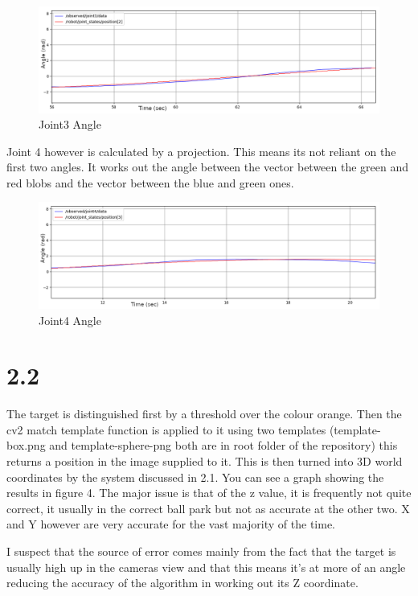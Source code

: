 \documentclass[11pt]{report}
\begin{document}
\begin{figure}[H]
    \includegraphics[width=\linewidth]{joint3.png}
    \caption{Joint3 Angle}
\end{figure}

Joint 4 however is calculated by a projection. This means its not reliant on the first two angles. It works out the angle between the vector between the
green and red blobs and the vector between the blue and green ones.

\begin{figure}
    \includegraphics[width=\linewidth]{joint4.png}
    \caption{Joint4 Angle}
\end{figure}

\section*{2.2}

The target is distinguished first by a threshold over the colour orange. Then the cv2 match template function is applied to it using two templates
(template-box.png and template-sphere-png both are in root folder of the repository) this returns a position in the image supplied to it. This is then
turned into 3D world coordinates by the system discussed in 2.1. You can see a graph showing the results in figure 4. The major issue is that of the z value, it is 
frequently not quite correct, it usually in the correct ball park but not as accurate at the other two. X and Y however are very accurate for the vast majority of the time.

I suspect that the source of error comes mainly from the fact that the target is usually high up in the cameras view and that this means it's at more of an angle
reducing the accuracy of the algorithm in working out its Z coordinate.
\end{document}
